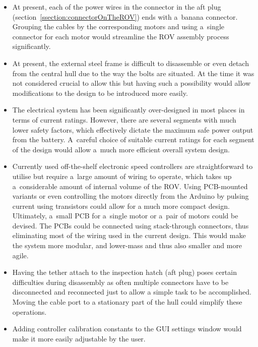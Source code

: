 \begin{itemize}
\item At present, each of the power wires in the connector in the aft plug (section~\ref{ssection:connectorOnTheROV})
	ends with a~banana connector. Grouping the cables by the corresponding motors
	and using a~single connector for each motor
	would streamline the ROV assembly process significantly.
\item At present, the external steel frame is difficult to disassemble or even
	detach from the central hull due to the way the bolts are situated. At the
	time it was not considered crucial to allow this but having such a possibility
	would allow modifications to the design to be introduced more easily.
\item The electrical system has been significantly over-designed in most places
	in terms of current ratings. However, there are several segments with much lower
	safety factors, which effectively dictate the maximum safe power output from the battery.
	A~careful choice of suitable current ratings for each segment of the design would allow a~much
	more efficient overall system design.
\item Currently used off-the-shelf electronic speed controllers are straightforward
	to utilise but require a~large amount of wiring to operate, which takes up a~considerable
	amount of internal volume of the ROV. Using PCB-mounted variants or even controlling
	the motors directly from the Arduino by pulsing current using transistors could
	allow for a much more compact design. Ultimately, a~small PCB for a~single motor
	or a~pair of motors could be devised. The PCBs could be connected using stack-through
	connectors, thus eliminating most of the wiring used in the current design. This
	would make the system more modular, and lower-mass and thus also smaller and more agile.
\item Having the tether attach to the inspection hatch (aft plug) poses certain difficulties
	during disassembly as often multiple connectors have to be disconnected and reconnected
	just to allow a simple task to be accomplished. Moving the cable port to a stationary part
	of the hull could simplify these operations.
\item Adding controller calibration constants to the GUI settings window would make it more
	easily adjustable by the user.
\end{itemize}
